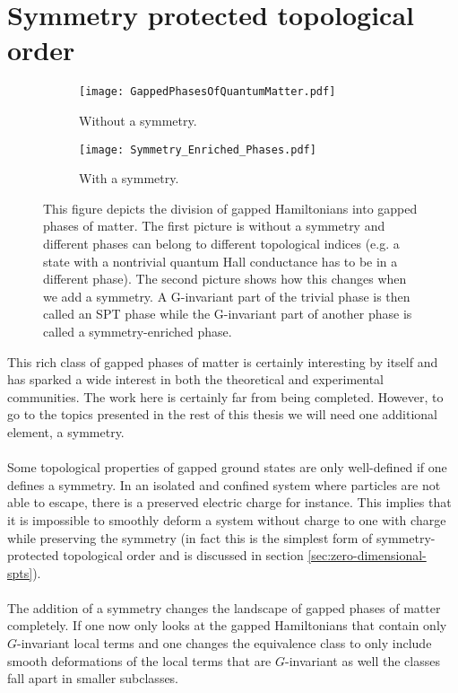\section{Symmetry protected topological order}
\begin{figure}
	\begin{subfigure}[b]{0.45\textwidth}
		\centering
		\texttt{[image: GappedPhasesOfQuantumMatter.pdf]}
		\caption{Without a symmetry.}
	\end{subfigure}
	\hfil
	\begin{subfigure}[b]{0.45\textwidth}
		\centering
		\texttt{[image: Symmetry\_Enriched\_Phases.pdf]}
		\caption{With a symmetry.}
	\end{subfigure}
	\caption{This figure depicts the division of gapped Hamiltonians into gapped phases of matter. The first picture is without a symmetry and different phases can belong to different topological indices (e.g. a state with a nontrivial quantum Hall conductance has to be in a different phase). The second picture shows how this changes when we add a symmetry. A G-invariant part of the trivial phase is then called an SPT phase while the G-invariant part of another phase is called a symmetry-enriched phase.}
	\label{fig:SymmetryEnrichedIntroduction}
\end{figure}
This rich class of gapped phases of matter is certainly interesting by itself and has sparked a wide interest in both the theoretical and experimental communities. The work here is certainly far from being completed. However, to go to the topics presented in the rest of this thesis we will need one additional element, a symmetry.
\\\\
Some topological properties of gapped ground states are only well-defined if one defines a symmetry. In an isolated and confined system where particles are not able to escape, there is a preserved electric charge for instance. This implies that it is impossible to smoothly deform a system without charge to one with charge while preserving the symmetry (in fact this is the simplest form of symmetry-protected topological order and is discussed in section \ref{sec:zero-dimensional-spts}).
\\\\
The addition of a symmetry changes the landscape of gapped phases of matter completely. If one now only looks at the gapped Hamiltonians that contain only $G$-invariant local terms and one changes the equivalence class to only include smooth deformations of the local terms that are $G$-invariant as well the classes fall apart in smaller subclasses.

